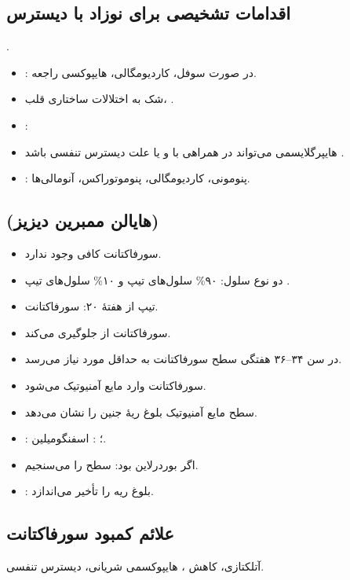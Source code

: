 \documentclass[12pt,a4paper]{article}
\begin{document}
\subsection*{اقدامات تشخیصی برای نوزاد با دیسترس}
.
\begin{itemize}
\item {}: در صورت سوفل، کاردیومگالی، هایپوکسی راجعه.
\item شک به اختلالات ساختاری قلب، .
\end{itemize}

\begin{itemize}
\item {}: 
\item هایپرگلایسمی می‌تواند در همراهی با و یا علت دیسترس تنفسی باشد .
\item {}: پنومونی، کاردیومگالی، پنوموتوراکس، آنومالی‌ها.
\end{itemize}
\subsection*{ (هایالن ممبرین دیزیز)}
\begin{itemize}
\item سورفاکتانت کافی وجود ندارد.
\item دو نوع سلول: ۹۰\% سلول‌های تیپ  و ۱۰\% سلول‌های تیپ .
\item تیپ  از هفتهٔ ۲۰: سورفاکتانت.
\item سورفاکتانت از  جلوگیری می‌کند.
\item در سن ۳۴–۳۶ هفتگی سطح سورفاکتانت به حداقل مورد نیاز می‌رسد.
\item سورفاکتانت وارد مایع آمنیوتیک می‌شود.
\item سطح  مایع آمنیوتیک بلوغ ریهٔ جنین را نشان می‌دهد.
\item {}: ؛ : اسفنگومیلین.
\item اگر  بوردرلاین بود: سطح  را می‌سنجیم.
\item {}: بلوغ ریه را تأخیر می‌اندازد.
\end{itemize}
\subsection*{علائم کمبود سورفاکتانت}
آتلکتازی، کاهش ، هایپوکسمی شریانی، دیسترس تنفسی.
\end{document}
